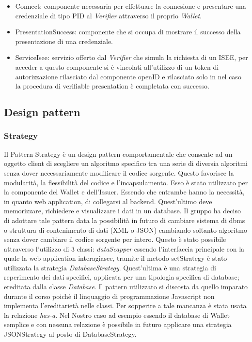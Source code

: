 \begin{itemize}
    \item Connect: componente necessaria per effettuare la connesione e presentare una credenziale di tipo PID al \textit{Verifier} attraverso il proprio \textit{Wallet}.
    \item PresentationSuccess: componente che si occupa di mostrare il successo della presentazione di una credenziale.
    \item ServiceIsee: servizio offerto dal \textit{Verifier} che simula la richiesta di un ISEE, per acceder a questo componente si è vincolati all'utilizzo di un token di autorizzazione rilasciato dal componente openID e rilasciato solo in nel caso la procedura di verifiable presentation è completata con successo. 
\end{itemize}

\subsection{Design pattern}
\subsubsection{Strategy}
Il Pattern Strategy è un design pattern comportamentale che consente ad un oggetto client di scegliere un algoritmo specifico tra una serie di diversia algoritmi senza dover necessariamente modificare il codice sorgente. Questo favorisce la modularità, la flessibilità del codice e l'incapsulamento. 
Esso è stato utilizzato per la componente del Wallet e dell'Issuer. Essendo che entrambe hanno la necessità, in quanto web application, di collegarsi al backend. Quest'ultimo deve memorizzare, richiedere e visualizzare i dati in un database. Il gruppo ha deciso di adottare tale pattern data la possibilità in futuro di cambiare sistema di dbms o struttura di contenimento di dati (XML o JSON) cambiando soltanto algoritmo senza dover cambiare il codice sorgente per intero. 
Questo è stato possibile attraverso l'utilizzo di 3 classi: \textit{dataScapper} essendo l'interfaccia principale con la quale la web application interagiasce, tramite il metodo setStrategy è stato utilizzata la strategia \textit{DatabaseStrategy}. Quest'ultima è una strategia di reperimento dei dati specifici, applicata per una tipologia specifica di database; ereditata dalla classe \textit{Database}. 
Il pattern utilizzato si discosta da quello imparato durante il corso poichè il linquaggio di programmazione Javascript non implementa l'ereditarietà nelle classi. Per sopperire a tale mancanza è stata usata la relazione \textit{has-a}.
Nel Nostro caso ad esempio essendo il database di Wallet semplice e con nessuna relazione è possibile in futuro applicare una strategia JSONStrategy al posto di DatabaseStrategy.

